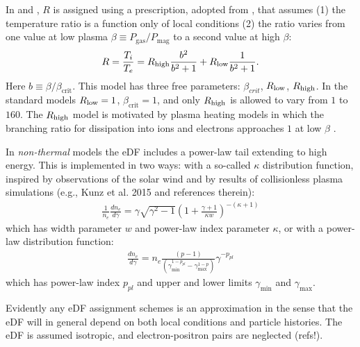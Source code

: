 In  and , $R$ is assigned using a prescription, adopted from \cite{2016A&A...586A..38M}, that assumes (1) the temperature ratio is a function only of local conditions (2) the ratio varies from one value at low plasma $\beta \equiv P_\mathrm{gas}/P_\mathrm{mag}$ to a second value at high $\beta$:
\begin{equation}
R = \frac{T_i}{T_e} = \Rh \frac{b^2}{b^2+1} + \Rl \frac{1}{b^2+1}.
\end{equation}
Here $b \equiv \beta/\beta_\mathrm{crit}$. This model has three free parameters: $\beta_{crit}$, $R_\mathrm{low}$, $R_\mathrm{high}$.  In the standard models $R_\mathrm{low} = 1$, $\beta_\mathrm{crit} = 1$, and only $R_\mathrm{high}$ is allowed to vary from $1$ to $160$.  The $R_\mathrm{high}$ model is motivated by plasma heating models in which the branching ratio for dissipation into ions and electrons approaches $1$ at low $\beta$ \citep[e.g.,][]{2010MNRAS.409L.104H,Kawazura771}.

In {\it non-thermal} models the eDF includes a power-law tail extending to high energy.
This is implemented in two ways: with a so-called $\kappa$ distribution function, inspired by observations of the solar wind and by results of
collisionless plasma simulations (e.g., Kunz et al. 2015 and references therein):
\begin{align}
  \frac{1}{n_e} \frac{d n_e}{d\gamma}= \gamma \sqrt{\gamma^2-1} \left(1+\frac{\gamma+1}{\kappa w}\right)^{-(\kappa+1)}
\end{align}
which has width parameter $w$ and power-law index parameter $\kappa$, or with a power-law distribution function:
\begin{align}
  \frac{d n_e}{d\gamma} =
  n_e \frac{ (p-1)}{(\gamma^{1-p_{pl}}_\mathrm{min} - \gamma^{1-p}_\mathrm{max})} \gamma^{-p_{pl}}
  \label{eq:nonthermaleDF}
\end{align}
which has power-law index $p_{pl}$ and upper and lower limits  $\gamma_{\min}$ and $\gamma_{\max}$. 

Evidently any eDF assignment schemes is an approximation in the sense that the eDF will in general depend on both local conditions and particle histories.  The eDF is assumed isotropic, and electron-positron pairs are neglected (refs!).

